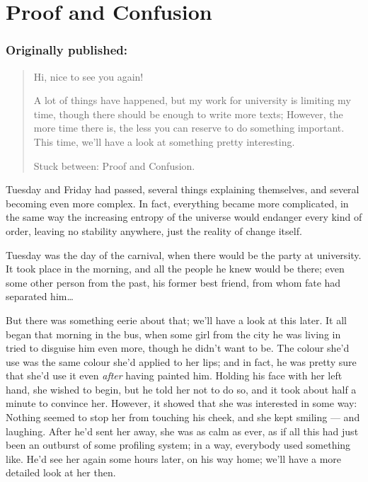 \chapter{Proof and Confusion}
\label{cha:proof-confusion}
\subsection*{Originally published: }
\begin{quote}
Hi, nice to see you again!

A lot of things have happened, but my work for university is limiting my time, though there should be enough to write more texts; However, the more time there is, the less you can reserve to do something important. This time, we'll have a look at something pretty interesting.

Stuck between: Proof and Confusion.
\end{quote}

Tuesday and Friday had passed, several things explaining themselves, and several becoming even more complex. In fact, everything became more complicated, in the same way the increasing entropy of the universe would endanger every kind of order, leaving no stability anywhere, just the reality of change itself.

Tuesday was the day of the carnival, when there would be the party at university. It took place in the morning, and all the people he knew would be there; even some other person from the past, his former best friend, from whom fate had separated him\ldots

But there was something eerie about that; we'll have a look at this later. It all began that morning in the bus, when some girl from the city he was living in tried to disguise him even more, though he didn't want to be. The colour she'd use was the same colour she'd applied to her lips; and in fact, he was pretty sure that she'd use it even \emph{after} having painted him. Holding his face with her left hand, she wished to begin, but he told her not to do so, and it took about half a minute to convince her. However, it showed that she was interested in some way: Nothing seemed to stop her from touching his cheek, and she kept smiling --- and laughing. After he'd sent her away, she was as calm as ever, as if all this had just been an outburst of some profiling system; in a way, everybody used something like. He'd see her again some hours later, on his way home; we'll have a more detailed look at her then.

